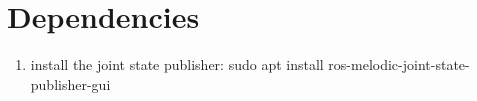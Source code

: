 \documentclass[11pt]{article}
\begin{document}
\section{Dependencies}
\begin{enumerate}
 \item{install the joint state publisher: sudo apt install ros-melodic-joint-state-publisher-gui}
\end{enumerate}
\end{document}
